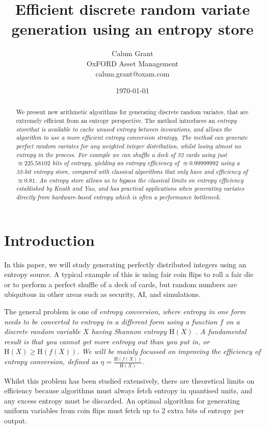 \documentclass[12pt]{article}
\title{Efficient discrete random variate generation using an entropy store}
\author{Calum Grant \\
OxFORD Asset Management \\
calum.grant@oxam.com}
\date{\today}
\newcommand{\entropy}[1]{\mathrm{H}(#1)}
\begin{document}
\maketitle

\begin{abstract}
    We present new arithmetic algorithms for generating discrete random variates, that are extremely efficient from an entropy perspective.
    The method introduces an \em entropy store\em that is available to cache unused entropy between invocations, and allows the algorithm to use a more efficient entropy conversion strategy.
    The method can generate perfect random variates for any weighted integer distribution, whilst losing almost no entropy in the process. 
    For example we can shuffle a deck of 52 cards using just $\approxeq 225.58102$ bits of entropy, yielding an entropy  efficiency of $\approxeq 0.99999992$ using a 32-bit entropy store, compared with classical algorithms that only have and efficiency of $\approxeq 0.81$. An entropy store allows us to bypass the classical limits on entropy efficiency established by Knuth and Yao, and has practical applications when generating variates directly from hardware-based entropy which is often a performance bottleneck.    
\end{abstract}

\section{Introduction}

In this paper, we will study generating perfectly distributed integers using an entropy source. A typical example of this is using fair coin flips to roll a fair die or to perform a perfect shuffle of a deck of cards, but random numbers are ubiquitous in other areas such as security, AI, and simulations.

The general problem is one of \em entropy conversion\em, where entropy in one form needs to be converted to entropy in a different form using a function $f$ on a discrete random variable $X$ having Shannon entropy $\entropy{X}$
\cite{shannon1948mathematical}.  
A fundamental result is that you cannot get more entropy out than you put in, or $\entropy{X} \ge \entropy{f(X)}$. \cite{cover1999elements} 
We will be mainly focussed on improving the \em efficiency \em of entropy conversion, defined as $\eta = \frac{\entropy{f(X)}}{\entropy{X}}$.

Whilst this problem has been studied extensively, there are theoretical limits on efficiency because algorithms must always fetch entropy in quantised units, and any excess entropy must be discarded. An optimal algorithm for generating uniform variables from coin flips must fetch up to 2 extra bits of entropy per output.  \cite{cover1999elements, Knuth1976TheCO}
\end{document}
